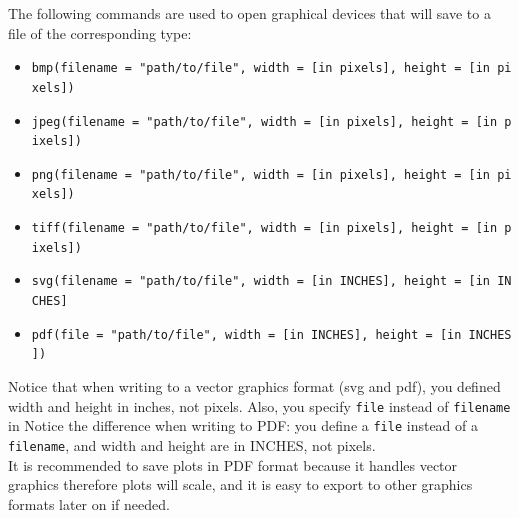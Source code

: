 \documentclass[
]{book}
\newenvironment{Shaded}{\begin{snugshade}}{\end{snugshade}}
\newcommand{\AttributeTok}[1]{\textcolor[rgb]{0.77,0.63,0.00}{#1}}
\newcommand{\CommentTok}[1]{\textcolor[rgb]{0.56,0.35,0.01}{\textit{#1}}}
\newcommand{\DecValTok}[1]{\textcolor[rgb]{0.00,0.00,0.81}{#1}}
\newcommand{\FloatTok}[1]{\textcolor[rgb]{0.00,0.00,0.81}{#1}}
\newcommand{\FunctionTok}[1]{\textcolor[rgb]{0.00,0.00,0.00}{#1}}
\newcommand{\NormalTok}[1]{#1}
\newcommand{\SpecialCharTok}[1]{\textcolor[rgb]{0.00,0.00,0.00}{#1}}
\newcommand{\StringTok}[1]{\textcolor[rgb]{0.31,0.60,0.02}{#1}}
\providecommand{\tightlist}{%
  \setlength{\itemsep}{0pt}\setlength{\parskip}{0pt}}
\begin{document}
The following commands are used to open graphical devices that will save to a file of the corresponding type:

\begin{itemize}
\tightlist
\item
  \texttt{bmp(filename\ =\ "path/to/file",\ width\ =\ {[}in\ pixels{]},\ height\ =\ {[}in\ pixels{]})}
\item
  \texttt{jpeg(filename\ =\ "path/to/file",\ width\ =\ {[}in\ pixels{]},\ height\ =\ {[}in\ pixels{]})}
\item
  \texttt{png(filename\ =\ "path/to/file",\ width\ =\ {[}in\ pixels{]},\ height\ =\ {[}in\ pixels{]})}
\item
  \texttt{tiff(filename\ =\ "path/to/file",\ width\ =\ {[}in\ pixels{]},\ height\ =\ {[}in\ pixels{]})}
\item
  \texttt{svg(filename\ =\ "path/to/file",\ width\ =\ {[}in\ INCHES{]},\ height\ =\ {[}in\ INCHES{]}}
\item
  \texttt{pdf(file\ =\ "path/to/file",\ width\ =\ {[}in\ INCHES{]},\ height\ =\ {[}in\ INCHES{]})}
\end{itemize}

Notice that when writing to a vector graphics format (svg and pdf), you defined width and height in inches, not pixels. Also, you specify \texttt{file} instead of \texttt{filename} in
Notice the difference when writing to PDF: you define a \texttt{file} instead of a \texttt{filename}, and width and height are in INCHES, not pixels.\\
It is recommended to save plots in PDF format because it handles vector graphics therefore plots will scale, and it is easy to export to other graphics formats later on if needed.

\begin{Shaded}
\end{Shaded}
\end{document}
